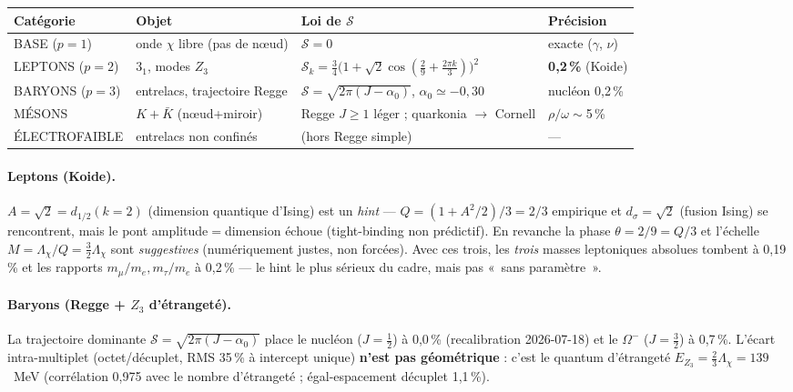 \documentclass[11pt]{article}
\begin{document}
\begin{center}
\begin{tabular}{@{}llll@{}}
\toprule
Catégorie & Objet & Loi de $\mathcal{S}$ & Précision \\
\midrule
BASE ($p=1$) & onde $\chi$ libre (pas de nœud) & $\mathcal{S}=0$ & exacte ($\gamma$, $\nu$) \\
LEPTONS ($p=2$) & $3_1$, modes $Z_3$ & $\mathcal{S}_k=\tfrac34\bigl(1+\sqrt2\cos(\tfrac29+\tfrac{2\pi k}{3})\bigr)^2$ & \textbf{0{,}2\,\%} (Koide) \\
BARYONS ($p=3$) & entrelacs, trajectoire Regge & $\mathcal{S}=\sqrt{2\pi(J-\alpha_0)}$, $\alpha_0\simeq-0{,}30$ & nucléon 0{,}2\,\% \\
MÉSONS & $K+\bar K$ (nœud+miroir) & Regge $J\ge1$ léger ; quarkonia $\to$ Cornell & $\rho/\omega\sim$5\,\% \\
ÉLECTROFAIBLE & entrelacs non confinés & (hors Regge simple) & --- \\
\bottomrule
\end{tabular}
\end{center}

\paragraph{Leptons (Koide).}
$A=\sqrt2=d_{1/2}(k{=}2)$ (dimension quantique d'Ising) est un \emph{hint} --- $Q=(1+A^2/2)/3=2/3$ empirique et $d_\sigma{=}\sqrt2$ (fusion Ising) se rencontrent, mais le pont amplitude$=$dimension échoue (tight-binding non prédictif). En revanche la phase $\theta=2/9=Q/3$ et l'échelle $M=\Lambda_\chi/Q=\tfrac32\Lambda_\chi$ sont \emph{suggestives} (numériquement justes, non forcées). Avec ces trois, les \emph{trois} masses leptoniques absolues tombent à 0{,}19\,\% et les rapports $m_\mu/m_e,m_\tau/m_e$ à 0{,}2\,\% --- le hint le plus sérieux du cadre, mais pas «~sans paramètre~».

\paragraph{Baryons (Regge + $Z_3$ d'étrangeté).}
La trajectoire dominante $\mathcal{S}=\sqrt{2\pi(J-\alpha_0)}$ place le nucléon ($J=\tfrac12$) à 0{,}0\,\% (recalibration 2026-07-18) et le $\Omega^-$ ($J=\tfrac32$) à 0{,}7\,\%. L'écart intra-multiplet (octet/décuplet, RMS 35\,\% à intercept unique) \textbf{n'est pas géométrique} : c'est le quantum d'étrangeté $E_{Z_3}=\tfrac23\Lambda_\chi=139$~MeV (corrélation 0{,}975 avec le nombre d'étrangeté ; égal-espacement décuplet 1{,}1\,\%).
\end{document}
